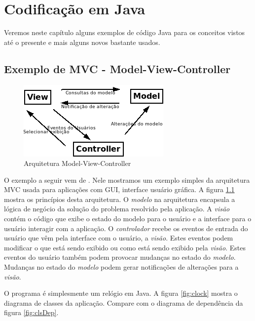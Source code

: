 \documentclass[
	11pt,				%
	openright,
	twoside,			%
	a4paper,			%
	english,			%
	french,
	brazil,				%
	sumario=tradicional
	]{abntex2}
\begin{document}
\chapter{Codificação em Java}

Veremos neste capítulo alguns exemplos de código Java para os conceitos vistos até o presente e mais alguns novos bastante usados.

\section{Exemplo de MVC - Model-View-Controller}

\begin{figure}[h]
\begin{center}
\includegraphics[scale=0.7]{MVC.png} 
\caption{Arquitetura Model-View-Controller} \label{fig:mvc}
\end{center}
\end{figure}

O exemplo a seguir vem de . Nele mostramos um exemplo simples da arquitetura MVC usada para aplicações com GUI, interface usuário gráfica. A figura \ref{fig:mvc} mostra os princípios desta arquitetura. O \emph{modelo} na arquitetura encapsula a lógica de negócio da solução do problema resolvido pela aplicação. A \emph{visão} contém o código que exibe o estado do modelo para o usuário e a interface para o usuário interagir com a aplicação. O \emph{controlador} recebe os eventos de entrada do usuário que vêm pela interface com o usuário, a \emph{visão}. Estes eventos podem modificar o que está sendo exibido ou como está sendo exibido pela \emph{visão}. Estes eventos do usuário também podem provocar mudanças no estado do \emph{modelo}. Mudanças no estado do \emph{modelo} podem gerar notificações de alterações para a \emph{visão}.

O programa é simplesmente um relógio em Java. A figura \ref{fig:clock} mostra o diagrama de classes da aplicação. Compare com o diagrama de dependência da figura \ref{fig:clsDep}.
\end{document}
